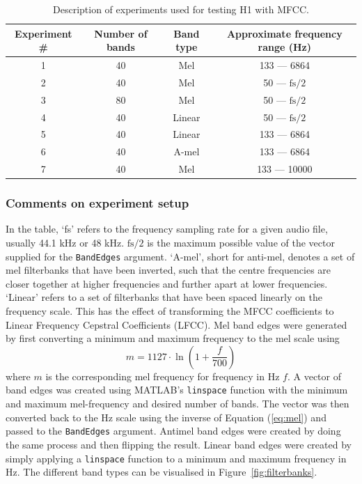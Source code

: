 \begin{table}[ht]
\begin{center}
\begin{tabular}{c c c c}
\toprule
Experiment \# & Number of bands & Band type & Approximate frequency range (Hz) \\ [0.5ex]
\midrule
1 & 40 & Mel & 133 --- 6864 \\
2 & 40 & Mel & 50 --- $\text{fs}/2$ \\
3 & 80 & Mel & 50 --- $\text{fs}/2$ \\
4 & 40 & Linear & 50 --- $\text{fs}/2$ \\
5 & 40 & Linear & 133 --- 6864 \\
6 & 40 & A-mel & 133 --- 6864 \\
7 & 40 & Mel & 133 --- 10000 \\
\bottomrule
\end{tabular}
\caption{Description of experiments used for testing H1 with
MFCC.}\label{table:h1_mfcc_experiments}
\end{center}
\end{table}

\subsubsection{Comments on experiment setup}

In the table, `fs' refers to the frequency sampling rate for a given audio file,
usually 44.1 kHz or 48 kHz. $\text{fs}/2$ is the maximum possible value  of the
vector supplied for the \texttt{BandEdges} argument. `A-mel', short for
anti-mel, denotes a set of mel filterbanks that have been inverted, such that
the centre frequencies are closer together at higher frequencies and further
apart at lower frequencies. `Linear' refers to a set of filterbanks that have
been spaced linearly on the frequency scale. This has the effect of transforming
the MFCC coefficients to Linear Frequency Cepstral Coefficients (LFCC). Mel band
edges were generated by first converting a minimum and maximum frequency to the
mel scale using
\begin{equation}\label{eq:mel}
m = 1127 \cdot \ln (1 + \frac{f}{700})
\end{equation}
where $m$ is the corresponding mel frequency for frequency in Hz $f$. A vector of band
edges was created using MATLAB's \texttt{linspace} function with the minimum and
maximum mel-frequency and desired number of bands. The vector was then converted
back to the Hz scale using the inverse of Equation (\ref{eq:mel}) and passed to
the \texttt{BandEdges} argument. Antimel band edges were created by doing the
same process and then flipping the result. Linear band edges were created by
simply applying a \texttt{linspace} function to a minimum and maximum frequency
in Hz. The different band types can be visualised in
Figure~\ref{fig:filterbanks}.

